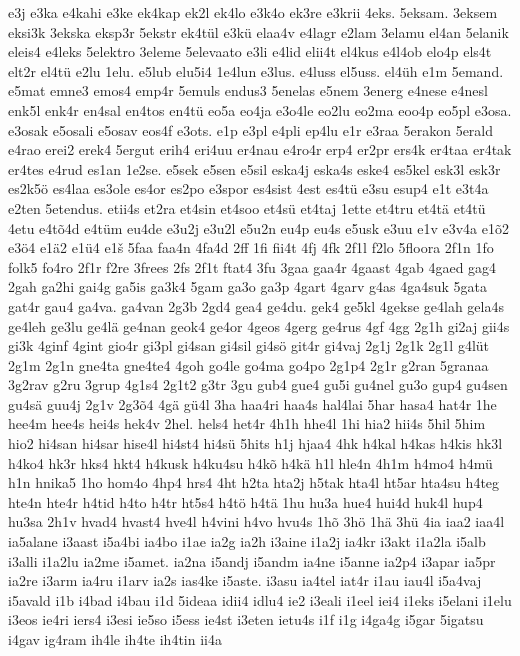 {e3j
e3ka
e4kahi
e3ke
ek4kap
ek2l
ek4lo
e3k4o
ek3re
e3krii
4eks.
5eksam.
3eksem
eksi3k
3ekska
eksp3r
5ekstr
ek4tül
e3kü
elaa4v
e4lagr
e2lam
3elamu
el4an
5elanik
eleis4
e4leks
5elektro
3eleme
5elevaato
e3li
e4lid
elii4t
el4kus
e4l4ob
elo4p
els4t
elt2r
el4tü
e2lu
1elu.
e5lub
elu5i4
1e4lun
e3lus.
e4luss
el5uss.
el4üh
e1m
5emand.
e5mat
emne3
emos4
emp4r
5emuls
endus3
5enelas
e5nem
3energ
e4nese
e4nesl
enk5l
enk4r
en4sal
en4tos
en4tü
eo5a
eo4ja
e3o4le
eo2lu
eo2ma
eoo4p
eo5pl
e3osa.
e3osak
e5osali
e5osav
eos4f
e3ots.
e1p
e3pl
e4pli
ep4lu
e1r
e3raa
5erakon
5erald
e4rao
erei2
erek4
5ergut
erih4
eri4uu
er4nau
e4ro4r
erp4
er2pr
ers4k
er4taa
er4tak
er4tes
e4rud
es1an
1e2se.
e5sek
e5sen
e5sil
eska4j
eska4s
eske4
es5kel
esk3l
esk3r
es2k5ö
es4laa
es3ole
es4or
es2po
e3spor
es4sist
4est
es4tü
e3su
esup4
e1t
e3t4a
e2ten
5etendus.
etii4s
et2ra
et4sin
et4soo
et4sü
et4taj
1ette
et4tru
et4tä
et4tü
4etu
e4tõ4d
e4tüm
eu4de
e3u2j
e3u2l
e5u2n
eu4p
eu4s
e5usk
e3uu
e1v
e3v4a
e1õ2
e3ö4
e1ä2
e1ü4
e1š
5faa
faa4n
4fa4d
2ff
1fi
fii4t
4fj
4fk
2f1l
f2lo
5floora
2f1n
1fo
folk5
fo4ro
2f1r
f2re
3frees
2fs
2f1t
ftat4
3fu
3gaa
gaa4r
4gaast
4gab
4gaed
gag4
2gah
ga2hi
gai4g
ga5is
ga3k4
5gam
ga3o
ga3p
4gart
4garv
g4as
4ga4suk
5gata
gat4r
gau4
ga4va.
ga4van
2g3b
2gd4
gea4
ge4du.
gek4
ge5kl
4gekse
ge4lah
gela4s
ge4leh
ge3lu
ge4lä
ge4nan
geok4
ge4or
4geos
4gerg
ge4rus
4gf
4gg
2g1h
gi2aj
gii4s
gi3k
4ginf
4gint
gio4r
gi3pl
gi4san
gi4sil
gi4sö
git4r
gi4vaj
2g1j
2g1k
2g1l
g4lüt
2g1m
2g1n
gne4ta
gne4te4
4goh
go4le
go4ma
go4po
2g1p4
2g1r
g2ran
5granaa
3g2rav
g2ru
3grup
4g1s4
2g1t2
g3tr
3gu
gub4
gue4
gu5i
gu4nel
gu3o
gup4
gu4sen
gu4sä
guu4j
2g1v
2g3õ4
4gä
gü4l
3ha
haa4ri
haa4s
hal4lai
5har
hasa4
hat4r
1he
hee4m
hee4s
hei4s
hek4v
2hel.
hels4
het4r
4h1h
hhe4l
1hi
hia2
hii4s
5hil
5him
hio2
hi4san
hi4sar
hise4l
hi4st4
hi4sü
5hits
h1j
hjaa4
4hk
h4kal
h4kas
h4kis
hk3l
h4ko4
hk3r
hks4
hkt4
h4kusk
h4ku4su
h4kõ
h4kä
h1l
hle4n
4h1m
h4mo4
h4mü
h1n
hnika5
1ho
hom4o
4hp4
hrs4
4ht
h2ta
hta2j
h5tak
hta4l
ht5ar
hta4su
h4teg
hte4n
hte4r
h4tid
h4to
h4tr
ht5s4
h4tö
h4tä
1hu
hu3a
hue4
hui4d
huk4l
hup4
hu3sa
2h1v
hvad4
hvast4
hve4l
h4vini
h4vo
hvu4s
1hõ
3hö
1hä
3hü
4ia
iaa2
iaa4l
ia5alane
i3aast
i5a4bi
ia4bo
i1ae
ia2g
ia2h
i3aine
i1a2j
ia4kr
i3akt
i1a2la
i5alb
i3alli
i1a2lu
ia2me
i5amet.
ia2na
i5andj
i5andm
ia4ne
i5anne
ia2p4
i3apar
ia5pr
ia2re
i3arm
ia4ru
i1arv
ia2s
ias4ke
i5aste.
i3asu
ia4tel
iat4r
i1au
iau4l
i5a4vaj
i5avald
i1b
i4bad
i4bau
i1d
5ideaa
idii4
idlu4
ie2
i3eali
i1eel
iei4
i1eks
i5elani
i1elu
i3eos
ie4ri
iers4
i3esi
ie5so
i5ess
ie4st
i3eten
ietu4s
i1f
i1g
i4ga4g
i5gar
5igatsu
i4gav
ig4ram
ih4le
ih4te
ih4tin
ii4a
}
